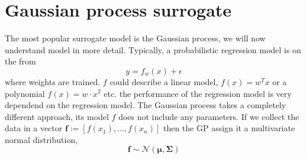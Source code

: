\section{Gaussian process surrogate}

The most popular surrogate model is the Gaussian process, we will now understand model
in more detail. Typically, a probabilistic regression model is on the from 
$$y = f_w(x) + \epsilon$$
where weights are trained. $f$ could describe a linear model, $f(x) = w^Tx$ or a polynomial
$f(x) = w\cdot x^2$ etc. the performance of the regression model is very dependend on the 
regression model. 
The Gaussian process takes a completely different approach, its model $f$ does not
include any parameters. If we collect the data in a vector $\textbf{f} := [f(x_1),\dots,f(x_n)]$
then the GP assign it a multivariate normal distribution, 
$$\textbf{f} \sim \mathcal{N}(\bm{\mu}, \bm{\Sigma})$$

